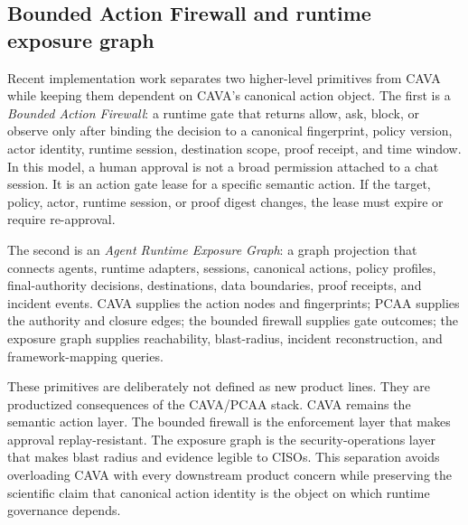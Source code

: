 \documentclass[11pt]{article}
\begin{document}
\subsection{Bounded Action Firewall and runtime exposure graph}

Recent implementation work separates two higher-level primitives from CAVA while keeping them dependent on CAVA's canonical action object. The first is a \emph{Bounded Action Firewall}: a runtime gate that returns allow, ask, block, or observe only after binding the decision to a canonical fingerprint, policy version, actor identity, runtime session, destination scope, proof receipt, and time window. In this model, a human approval is not a broad permission attached to a chat session. It is an action gate lease for a specific semantic action. If the target, policy, actor, runtime session, or proof digest changes, the lease must expire or require re-approval.

The second is an \emph{Agent Runtime Exposure Graph}: a graph projection that connects agents, runtime adapters, sessions, canonical actions, policy profiles, final-authority decisions, destinations, data boundaries, proof receipts, and incident events. CAVA supplies the action nodes and fingerprints; PCAA supplies the authority and closure edges; the bounded firewall supplies gate outcomes; the exposure graph supplies reachability, blast-radius, incident reconstruction, and framework-mapping queries.

These primitives are deliberately not defined as new product lines. They are productized consequences of the CAVA/PCAA stack. CAVA remains the semantic action layer. The bounded firewall is the enforcement layer that makes approval replay-resistant. The exposure graph is the security-operations layer that makes blast radius and evidence legible to CISOs. This separation avoids overloading CAVA with every downstream product concern while preserving the scientific claim that canonical action identity is the object on which runtime governance depends.
\end{document}

